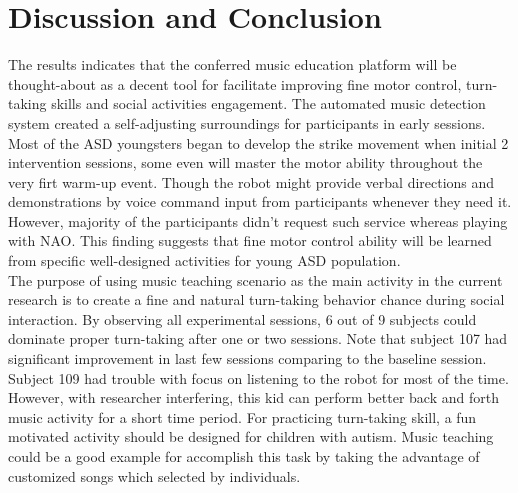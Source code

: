 \chapter{Discussion and Conclusion}
The results indicates that the conferred music education platform will be thought-about as a decent tool for facilitate 
improving fine motor control, turn-taking skills and social activities engagement. The automated music 
detection system created a self-adjusting surroundings for participants in early sessions. Most
of the ASD youngsters began to develop the strike movement when initial 2 intervention sessions, some 
even will master the motor ability throughout the very firt warm-up event. Though the robot might
provide verbal directions and demonstrations by voice command input from participants whenever they need it. However, 
majority of the participants didn't request such service whereas playing with NAO. This finding
suggests that fine motor control ability will be learned from specific well-designed activities for
young ASD population. \\

The purpose of using music teaching scenario as the main activity in the current research is to 
create a fine and natural turn-taking behavior chance during social interaction. By observing all 
experimental sessions, 6 out of 9 subjects could dominate proper turn-taking after one or two
sessions. Note that subject 107 had significant improvement in last few sessions comparing to the
baseline session. Subject 109 had trouble with focus on listening to the robot for most of the time.
However, with researcher interfering, this kid can perform better back and forth music activity 
for a short time period. For practicing turn-taking skill, a fun motivated activity should be 
designed for children with autism. Music teaching could be a good example for accomplish this
task by taking the advantage of customized songs which selected by individuals.\\

